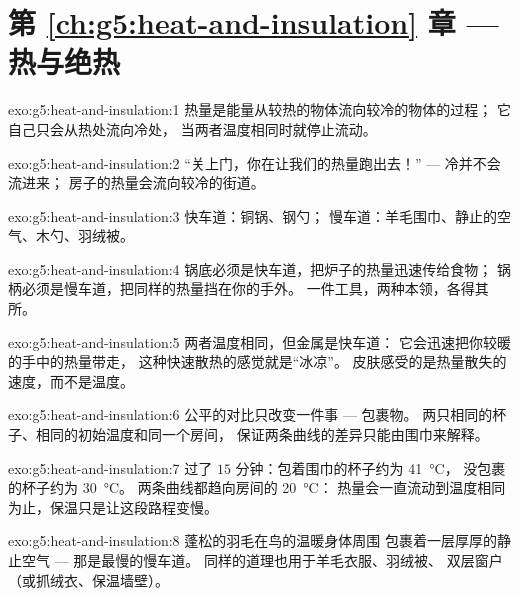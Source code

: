 \section*{第 \ref{ch:g5:heat-and-insulation} 章 --- 热与绝热}

\begin{solution}{exo:g5:heat-and-insulation:1}
热量是能量从较热的物体流向较冷的物体的过程；
它自己只会从热处流向冷处，
当两者温度相同时就停止流动。
\end{solution}

\begin{solution}{exo:g5:heat-and-insulation:2}
“关上门，你在让我们的热量跑出去！” --- 冷并不会流进来；
房子的热量会流向较冷的街道。
\end{solution}

\begin{solution}{exo:g5:heat-and-insulation:3}
快车道：铜锅、钢勺；
慢车道：羊毛围巾、静止的空气、木勺、羽绒被。
\end{solution}

\begin{solution}{exo:g5:heat-and-insulation:4}
锅底必须是快车道，把炉子的热量迅速传给食物；
锅柄必须是慢车道，把同样的热量挡在你的手外。
一件工具，两种本领，各得其所。
\end{solution}

\begin{solution}{exo:g5:heat-and-insulation:5}
两者温度相同，但金属是快车道：
它会迅速把你较暖的手中的热量带走，
这种快速散热的感觉就是“冰凉”。
皮肤感受的是热量散失的速度，而不是温度。
\end{solution}

\begin{solution}{exo:g5:heat-and-insulation:6}
公平的对比只改变一件事 --- 包裹物。
两只相同的杯子、相同的初始温度和同一个房间，
保证两条曲线的差异只能由围巾来解释。
\end{solution}

\begin{solution}{exo:g5:heat-and-insulation:7}
过了 $15$ 分钟：包着围巾的杯子约为 \qty{41}{\celsius}，
没包裹的杯子约为 \qty{30}{\celsius}。
两条曲线都趋向房间的 \qty{20}{\celsius}：
热量会一直流动到温度相同为止，保温只是让这段路程变慢。
\end{solution}

\begin{solution}{exo:g5:heat-and-insulation:8}
蓬松的羽毛在鸟的温暖身体周围
包裹着一层厚厚的静止空气 --- 那是最慢的慢车道。
同样的道理也用于羊毛衣服、羽绒被、
双层窗户（或抓绒衣、保温墙壁）。
\end{solution}

